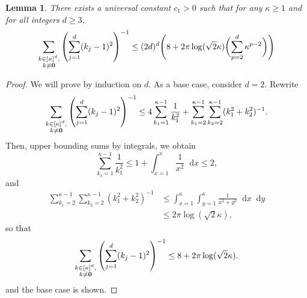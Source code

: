 \documentclass{article}
\newcommand{\1}{\mathbb{I}}
\newcommand{\dif}{\mathop{}\!\mathrm{d}}
\theoremstyle{alden}
\theoremstyle{aldenthm}
\newtheorem{lemma}{Lemma}
\theoremstyle{definition}
\theoremstyle{remark}
\begin{document}
\begin{lemma}
	\label{lem: grid_eigenvalues}
	There exists a universal constant $c_1 > 0$ such that for any $\kappa \geq 1$ and for all integers $d \geq 3$,
	\begin{equation*}
	\sum_{\substack{k \in [\kappa]^d, \\ k \neq \bf{0}}} \left(\sum_{j = 1}^{d} (k_j - 1)^2\right)^{-1} \leq (2d)^d \Biggl(8 + 2 \pi \log (\sqrt{2} \kappa) \biggl(\sum_{p = 2}^{d} \kappa^{p - 2}\biggr) \Biggr)
	\end{equation*}
\end{lemma}
\begin{proof}
	We will prove by induction on $d$. As a base case, consider $d  = 2$. Rewrite
	\begin{equation*}
	\sum_{\substack{k \in [\kappa]^d, \\ k \neq \bf{0}}} \left(\sum_{j = 1}^{d} (k_j - 1)^2\right)^{-1} \leq 4 \sum_{k_1 = 1}^{\kappa - 1} \frac{1}{k_1^2}  + \sum_{k_1 =2}^{\kappa - 1} \sum_{k_2 = 2}^{\kappa - 1} (k_1^2 + k_2^2)^{-1}.
	\end{equation*}
	Then, upper bounding sums by integrals, we obtain
	\begin{equation*}
	\sum_{k_1 = 1}^{\kappa - 1} \frac{1}{k_1^2} \leq 1 +  \int_{x = 1}^{\kappa} \frac{1}{x^2} \dif x \leq 2,
	\end{equation*}
	and 
	\begin{align*}
	\sum_{k_1 = 2}^{\kappa - 1} \sum_{k_2 = 2}^{\kappa - 1} (k_1^2 + k_2^2)^{-1} & \leq \int_{x = 1}^{\kappa} \int_{y = 1}^{\kappa} \frac{1}{x^2 + y^2} \dif x \dif y \\
	& \leq 2 \pi \log(\sqrt{2} \kappa),
	\end{align*}
	so that
	\begin{equation*}
	\sum_{\substack{k \in [\kappa]^d, \\ k \neq \bf{0}}} \left(\sum_{j = 1}^{d} (k_j - 1)^2\right)^{-1} \leq 8 + 2 \pi \log(\sqrt{2} \kappa).
	\end{equation*}
	and the base case is shown. 
	

\end{proof}
\end{document}
